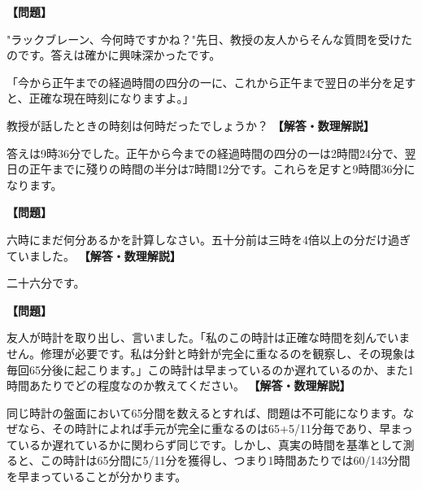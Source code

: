 \documentclass[10pt,a4paper,oneside,openany]{ltjsbook}
\begin{document}
\begin{tcolorbox}[colback=softblue,colframe=primaryblue,title=\textbf{第 57 問：時間は何時だったか？ （原題: WHAT WAS THE TIME?）},arc=2mm,boxrule=1pt,breakable]
\textbf{【問題】}\par\vspace{0.3em}
"ラックブレーン、今何時ですかね？"先日、教授の友人からそんな質問を受けたのです。答えは確かに興味深かったです。

「今から正午までの経過時間の四分の一に、これから正午まで翌日の半分を足すと、正確な現在時刻になりますよ。」

教授が話したときの時刻は何時だったでしょうか？
\tcblower
\textbf{【解答・数理解説】}\par\vspace{0.3em}
答えは9時36分でした。正午から今までの経過時間の四分の一は2時間24分で、翌日の正午までに殘りの時間の半分は7時間12分です。これらを足すと9時間36分になります。
\end{tcolorbox}

\begin{tcolorbox}[colback=softblue,colframe=primaryblue,title=\textbf{第 58 問：時刻に関するパズル （原題: A TIME PUZZLE.）},arc=2mm,boxrule=1pt,breakable]
\textbf{【問題】}\par\vspace{0.3em}
六時にまだ何分あるかを計算しなさい。五十分前は三時を4倍以上の分だけ過ぎていました。
\tcblower
\textbf{【解答・数理解説】}\par\vspace{0.3em}
二十六分です。
\end{tcolorbox}

\begin{tcolorbox}[colback=softblue,colframe=primaryblue,title=\textbf{第 59 問：不思議な時計 （原題: A PUZZLING WATCH.）},arc=2mm,boxrule=1pt,breakable]
\textbf{【問題】}\par\vspace{0.3em}
友人が時計を取り出し、言いました。「私のこの時計は正確な時間を刻んでいません。修理が必要です。私は分針と時針が完全に重なるのを観察し、その現象は毎回65分後に起こります。」この時計は早まっているのか遅れているのか、また1時間あたりでどの程度なのか教えてください。
\tcblower
\textbf{【解答・数理解説】}\par\vspace{0.3em}
同じ時計の盤面において65分間を数えるとすれば、問題は不可能になります。なぜなら、その時計によれば手元が完全に重なるのは65+5/11分毎であり、早まっているか遅れているかに関わらず同じです。しかし、真実の時間を基準として測ると、この時計は65分間に5/11分を獲得し、つまり1時間あたりでは60/143分間を早まっていることが分かります。
\end{tcolorbox}
\end{document}
